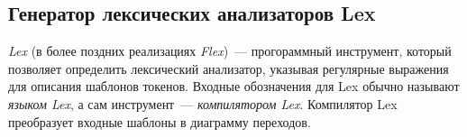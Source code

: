 \subsection{Генератор лексических анализаторов Lex} \label{sub115}

\textit{Lex} (в более поздних реализациях \textit{Flex})~--- прогораммный инструмент, который позволяет определить лексический анализатор, указывая регулярные выражения для описания шаблонов токенов. Входные обозначения для Lex обычно называют \textit{языком Lex}, а сам инструмент~--- \textit{компилятором Lex}. Компилятор Lex преобразует входные шаблоны в диаграмму переходов. 

